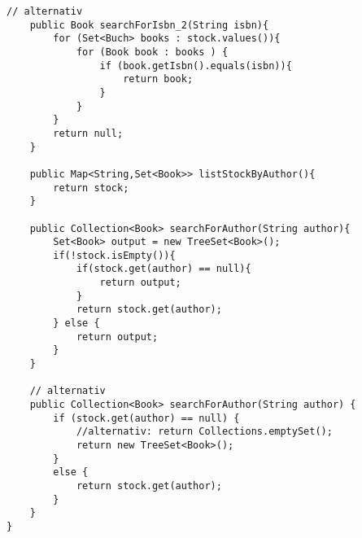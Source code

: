 \documentclass{article}
\begin{document}
\begin{lstlisting}[style=java,tabsize=2]
	// alternativ
	public Book searchForIsbn_2(String isbn){
		for (Set<Buch> books : stock.values()){
			for (Book book : books ) {
				if (book.getIsbn().equals(isbn)){
					return book;
				}
			}
		}
		return null;
	}

	public Map<String,Set<Book>> listStockByAuthor(){
		return stock;
	}

	public Collection<Book> searchForAuthor(String author){
		Set<Book> output = new TreeSet<Book>();
		if(!stock.isEmpty()){
			if(stock.get(author) == null){
				return output;
			}
			return stock.get(author);
		} else {
			return output;
		}
	}

	// alternativ
	public Collection<Book> searchForAuthor(String author) {
		if (stock.get(author) == null) {
			//alternativ: return Collections.emptySet();
			return new TreeSet<Book>();
		} 
		else {
			return stock.get(author);
		}
	}
}
	\end{lstlisting}
	
\end{document}
